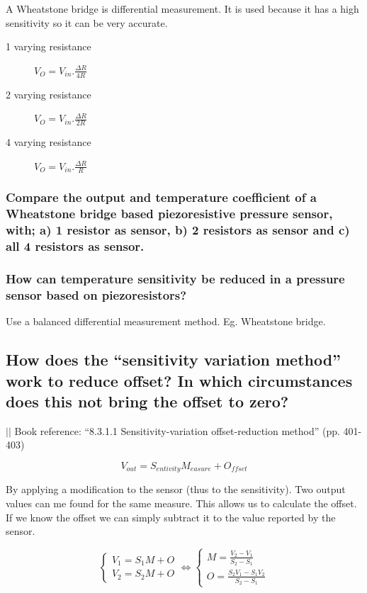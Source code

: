 \documentclass[10pt,a4paper]{article}
\newcommand{\bookref}[2]{\indent\indent\indent\indent $\vert\vert$ Book reference: ``#1'' (pp. #2) \newline}
\begin{document}
A Wheatstone bridge is differential measurement. It is used because it has a high sensitivity so it can be very accurate.

\begin{description}
	\item[1 varying resistance] $V_{O} = V_{in}.\frac{\Delta R}{4R}$
	\item[2 varying resistance] $V_{O} = V_{in}.\frac{\Delta R}{2R}$
	\item[4 varying resistance] $V_{O} = V_{in}.\frac{\Delta R}{R}$
\end{description}

\subsubsection{Compare the output and temperature coefficient of a Wheatstone bridge based piezoresistive pressure sensor, with; a) 1 resistor as sensor, b) 2 resistors as sensor and c) all 4 resistors as sensor.}

\subsubsection{How can temperature sensitivity be reduced in a pressure sensor based on piezoresistors?}

Use a balanced differential measurement method. Eg. Wheatstone bridge.

\subsection{How does the ``sensitivity variation method'' work to reduce offset? In which circumstances does this not bring the offset to zero?}

\bookref{8.3.1.1 Sensitivity-variation offset-reduction method}{401-403}

\[ V_{out} = S_{entivity}M_{easure} + O_{ffset} \]

By applying a modification to the sensor (thus to the sensitivity). Two output values can me found for the same measure. This allows us to calculate the offset. If we know the offset we can simply subtract it to the value reported by the sensor.

\[
\begin{cases} V_1 = S_1M + O  \\ V_2 = S_2M+O \end{cases} \iff
\begin{cases} M = \frac{V_2-V_1}{S_2-S_1}  \\ O = \frac{S_2 V_1 - S_1 V_2}{S_2 - S_1} \end{cases} 
\]
\end{document}
